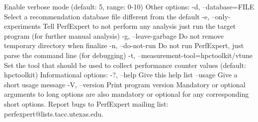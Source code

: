 \begin{prompt}
                            Enable verbose mode (default: 5, range: 0-10)
Other options:
 -d, --database=FILE        Select a recommendation database file different
                            from the default
 -e, --only-experiments     Tell PerfExpert to not perform any analysis just
                            run the target program (for further manual
                            analysis)
 -g, --leave-garbage        Do not remove temporary directory when finalize
 -n, --do-not-run           Do not run PerfExpert, just parse the command line
                            (for debugging)
 -t, --measurement-tool=hpctoolkit/vtune
                            Set the tool that should be used to collect
                            performance counter values (default: hpctoolkit)
Informational options:
 -?, --help                 Give this help list
     --usage                Give a short usage message
 -V, --version              Print program version
Mandatory or optional arguments to long options are also mandatory or optional
for any corresponding short options.
Report bugs to PerfExpert mailing list: perfexpert@lists.tacc.utexas.edu.
\end{prompt}

